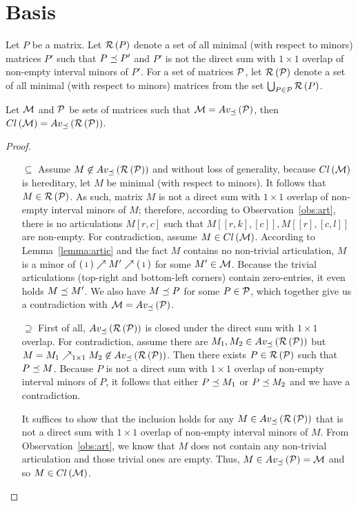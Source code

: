 \section{Basis}

\begin{defn}
Let $P$ be a matrix. Let $\mathcal{R}\left(P\right)$ denote a set of all minimal (with respect to minors) matrices $P'$ such that $P\preceq P'$ and $P'$ is not the direct sum with $1\times1$ overlap of non-empty interval minors of $P'$. For a set of matrices $\mathcal{P}$, let $\mathcal{R}\left(\mathcal{P}\right)$ denote a set of all minimal (with respect to minors) matrices from the set $\bigcup_{P\in\mathcal{P}}\mathcal{R}\left(P\right)$.
\end{defn}

\begin{thm}
\label{thm:basis}
Let $\mathcal{M}$ and $\mathcal{P}$ be sets of matrices such that $\mathcal{M}=Av_{\preceq}\left(\mathcal{P}\right)$, then $Cl\left(\mathcal{M}\right)=Av_{\preceq}\left(\mathcal{R}\left(\mathcal{P}\right)\right)$.
\end{thm}
\begin{proof}
\begin{itemize}
	\item[$\subseteq$] Assume $M\not\in Av_{\preceq}\left(\mathcal{R}\left(\mathcal{P}\right)\right)$ and without loss of generality, because $Cl\left(\mathcal{M}\right)$ is hereditary, let $M$ be minimal (with respect to minors). It follows that $M\in\mathcal{R}\left(\mathcal{P}\right)$. As such, matrix $M$ is not a direct sum with $1\times1$ overlap of non-empty interval minors of $M$; therefore, according to Observation~\ref{obs:art}, there is no articulations $M[r,c]$ such that $M[[r,k],[c]],M[[r],[c,l]]$ are non-empty. For contradiction, assume $M\in Cl\left(\mathcal{M}\right)$. According to Lemma~\ref{lemma:artic} and the fact $M$ contains no non-trivial articulation, $M$ is a minor of $\left(\begin{smallmatrix}1\end{smallmatrix}\right)\nearrow M'\nearrow\left(\begin{smallmatrix}1\end{smallmatrix}\right)$ for some $M'\in\mathcal{M}$. Because the trivial articulations (top-right and bottom-left corners) contain zero-entries, it even holds $M\preceq M'$. We also have $M\preceq P$ for some $P\in\mathcal{P}$, which together give us a contradiction with $\mathcal{M}=Av_{\preceq}\left(\mathcal{P}\right)$.
	\item[$\supseteq$] First of all, $Av_{\preceq}\left(\mathcal{R}\left(\mathcal{P}\right)\right)$ is closed under the direct sum with $1\times1$ overlap. For contradiction, assume there are $M_1,M_2\in Av_{\preceq}\left(\mathcal{R}\left(\mathcal{P}\right)\right)$ but $M=M_1\nearrow_{1\times1}M_2\not\in Av_{\preceq}\left(\mathcal{R}\left(\mathcal{P}\right)\right)$. Then there exists $P\in\mathcal{R}\left(\mathcal{P}\right)$ such that $P\preceq M$. Because $P$ is not a direct sum with $1\times1$ overlap of non-empty interval minors of $P$, it follows that either $P\preceq M_1$ or $P\preceq M_2$ and we have a contradiction.

It suffices to show that the inclusion holds for any $M\in Av_{\preceq}\left(\mathcal{R}\left(\mathcal{P}\right)\right)$ that is not a direct sum with $1\times1$ overlap of non-empty interval minors of $M$. From Observation~\ref{obs:art}, we know that $M$ does not contain any non-trivial articulation and those trivial ones are empty. Thus, $M\in Av_{\preceq}\left(\mathcal{P}\right)=\mathcal{M}$ and so $M\in Cl\left(\mathcal{M}\right)$.
\end{itemize}
\end{proof}

